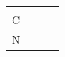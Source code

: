 \begin{enumerate}[noitemsep, label=\textbf{\arabic*}. ]
{{\begin{center}
\begin{tabular}[t]{|l|l|l|l|}
    
         &
    
    
         &
    
    
     \tabularnewline\cline{1-1}\cline{2-2}\cline{3-3}\cline{4-4}
    
    
        \begin{math}\mathrm{C}\end{math} &
    
    
         &
    
    
         &
    
    
     \tabularnewline\cline{1-1}\cline{2-2}\cline{3-3}\cline{4-4}
    
    
        \begin{math}\mathrm{N}\end{math} &
    

\end{tabular}
\end{center}}}
\end{enumerate}
